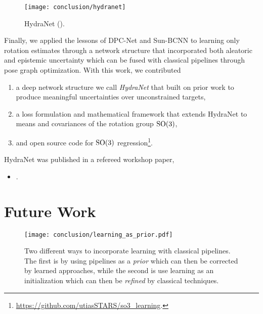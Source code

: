 \begin{wrapfigure}{r}{0.3\textwidth}
  \begin{center}
  	\vspace{-20pt}
    \texttt{[image: conclusion/hydranet]}
     \vspace{-15pt}
  \end{center}
  \caption{HydraNet ().}
  \vspace{-5pt}
\end{wrapfigure}


Finally, we applied the lessons of DPC-Net and Sun-BCNN to learning only rotation estimates through a network structure that incorporated both aleatoric and epistemic uncertainty which can be fused with classical pipelines through pose graph optimization. With this work, we contributed
\begin{enumerate}
\item a deep network structure we call \textit{HydraNet} that built on prior work \cite{Lakshminarayanan2017,Osband2016} to produce meaningful uncertainties over unconstrained targets,
\item a loss formulation and mathematical framework that extends HydraNet to means and covariances of the rotation group $\mathrm{SO}(3)$,
\item and open source code for $\mathrm{SO}(3)$ regression\footnote{\url{https://github.com/utiasSTARS/so3_learning}.}.
\end{enumerate}

\noindent HydraNet was published in a refereed workshop paper,
\begin{itemize}
\item {}.
\end{itemize}


\section{Future Work}

\begin{figure}
\begin{center}
		\texttt{[image: conclusion/learning\_as\_prior.pdf]}
		\caption{Two different ways to incorporate learning with classical pipelines. The first is by using pipelines as a \textit{prior} which can then be corrected by learned approaches, while the second is use learning as an initialization which can then be \textit{refined} by classical techniques.}
  	\label{fig:conc_learning_as_prior}
\end{center}
\end{figure}


